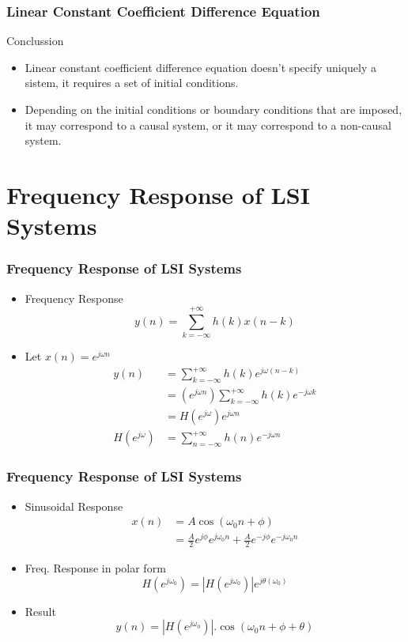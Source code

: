 \documentclass[pdflatex,compress]{beamer}
\begin{document}
\begin{frame}
	\frametitle{Linear Constant Coefficient Difference Equation}
	\begin{alertblock}{Conclussion}
		\begin{itemize}
			\item Linear constant coefficient difference equation doesn't specify uniquely a sistem, it requires a set of initial conditions.
			\item Depending on the initial conditions or boundary conditions that are imposed, it may correspond to a causal system, or it may correspond to a non-causal system.
		\end{itemize}
	\end{alertblock}
\end{frame}

\section{Frequency Response of LSI Systems}

\begin{frame}
	\frametitle{Frequency Response of LSI Systems}
	\begin{itemize}
		\item Frequency Response
		\[ y(n) = \sum_{k = -\infty}^{+\infty} h(k) x(n-k)\]
		\item[] Let $ x(n) = e^{j\omega n} $
		\begin{align*}
			y(n) &= \sum_{k = -\infty}^{+\infty} h(k) e^{j\omega (n - k)} \\
			&= (e^{j\omega n} ) \sum_{k = -\infty}^{+\infty} h(k) e^{-j\omega k} \\ 
			&= H(e^{j\omega}) e^{j\omega n} \\
			H(e^{j\omega}) &=  \sum_{n = -\infty}^{+\infty} h(n) e^{-j\omega n}
		\end{align*}
	\end{itemize}
\end{frame}

\begin{frame}
	\frametitle{Frequency Response of LSI Systems}
	\begin{itemize}
		\item Sinusoidal Response
		\begin{align*}
			x(n) &= A\cos (\omega_0 n + \phi) \\ 
			&= \frac{A}{2}e^{j \phi} e^{j\omega_0n} + \frac{A}{2}e^{-j \phi} e^{-j\omega_0n}
		\end{align*}
		\item Freq. Response in polar form
		\[ H(e^{j\omega_0}) = |H(e^{j\omega_0})| e^{j\theta(\omega_0)} \]
		\item Result
		\[ y(n) = |H(e^{j\omega_0})| . \cos (\omega_0 n + \phi + \theta)  \]
	\end{itemize}
\end{frame}
\end{document}
